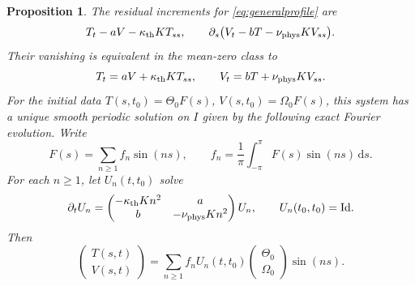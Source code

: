 \documentclass[11pt]{article}
\newtheorem{proposition}{Proposition}
\newcommand{\dd}{\mathrm d}
\newcommand{\thd}{\kappa_{\rm th}}
\newcommand{\vis}{\nu_{\rm phys}}
\begin{document}
\begin{proposition}\label{prop:profile}
The residual increments for \eqref{eq:generalprofile} are
\begin{equation}\label{eq:profileR}
 T_t-aV-\thd K T_{ss},\qquad
 \partial_s\big(V_t-bT-\vis K V_{ss}\big).
\end{equation}
Their vanishing is equivalent in the mean-zero class to
\begin{equation}\label{eq:profilePDE}
 T_t=aV+\thd K T_{ss},\qquad
 V_t=bT+\vis K V_{ss}.
\end{equation}
For the initial data $T(s,t_0)=\Theta_0F(s)$,
$V(s,t_0)=\Omega_0F(s)$, this system has a unique smooth periodic solution
on $I$ given by the following exact Fourier evolution. Write
\begin{equation}\label{eq:fourier}
 F(s)=\sum_{n\geq1} f_n\sin(ns),\qquad
 f_n=\frac1\pi\int_{-\pi}^{\pi}F(s)\sin(ns)\,\dd s.
\end{equation}
For each $n\geq1$, let $U_n(t,t_0)$ solve
\begin{equation}\label{eq:Un}
 \partial_t U_n=
 \begin{pmatrix}-\thd K n^2&a\\b&-\vis K n^2\end{pmatrix}U_n,
 \qquad U_n(t_0,t_0)=\mathrm{Id}.
\end{equation}
Then
\begin{equation}\label{eq:profileSolution}
 \begin{pmatrix}T(s,t)\\V(s,t)\end{pmatrix}
 =\sum_{n\geq1}f_n U_n(t,t_0)
       \begin{pmatrix}\Theta_0\\\Omega_0\end{pmatrix}\sin(ns).
\end{equation}
\end{proposition}
\end{document}
